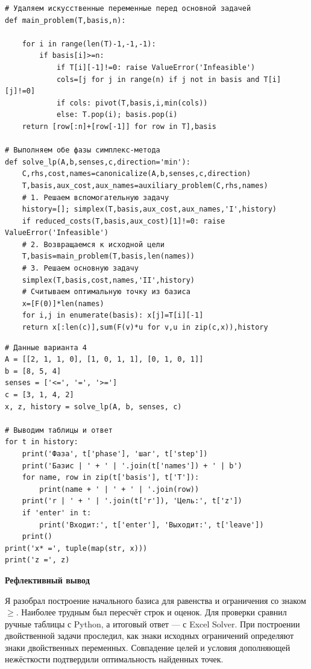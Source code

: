 \documentclass[12pt,a4paper]{article}
\begin{document}
\begin{Verbatim}[fontsize=\scriptsize,breaklines=true,breakanywhere=true]
# Удаляем искусственные переменные перед основной задачей
def main_problem(T,basis,n):

    for i in range(len(T)-1,-1,-1):
        if basis[i]>=n:
            if T[i][-1]!=0: raise ValueError('Infeasible')
            cols=[j for j in range(n) if j not in basis and T[i][j]!=0]
            if cols: pivot(T,basis,i,min(cols))
            else: T.pop(i); basis.pop(i)
    return [row[:n]+[row[-1]] for row in T],basis

# Выполняем обе фазы симплекс-метода
def solve_lp(A,b,senses,c,direction='min'):
    C,rhs,cost,names=canonicalize(A,b,senses,c,direction)
    T,basis,aux_cost,aux_names=auxiliary_problem(C,rhs,names)
    # 1. Решаем вспомогательную задачу
    history=[]; simplex(T,basis,aux_cost,aux_names,'I',history)
    if reduced_costs(T,basis,aux_cost)[1]!=0: raise ValueError('Infeasible')
    # 2. Возвращаемся к исходной цели
    T,basis=main_problem(T,basis,len(names))
    # 3. Решаем основную задачу
    simplex(T,basis,cost,names,'II',history)
    # Считываем оптимальную точку из базиса
    x=[F(0)]*len(names)
    for i,j in enumerate(basis): x[j]=T[i][-1]
    return x[:len(c)],sum(F(v)*u for v,u in zip(c,x)),history
\end{Verbatim}
\begin{Verbatim}[fontsize=\scriptsize,breaklines=true,breakanywhere=true]
# Данные варианта 4
A = [[2, 1, 1, 0], [1, 0, 1, 1], [0, 1, 0, 1]]
b = [8, 5, 4]
senses = ['<=', '=', '>=']
c = [3, 1, 4, 2]
x, z, history = solve_lp(A, b, senses, c)

# Выводим таблицы и ответ
for t in history:
    print('Фаза', t['phase'], 'шаг', t['step'])
    print('Базис | ' + ' | '.join(t['names']) + ' | b')
    for name, row in zip(t['basis'], t['T']):
        print(name + ' | ' + ' | '.join(row))
    print('r | ' + ' | '.join(t['r']), 'Цель:', t['z'])
    if 'enter' in t:
        print('Входит:', t['enter'], 'Выходит:', t['leave'])
    print()
print('x* =', tuple(map(str, x)))
print('z =', z)
\end{Verbatim}
\par\textbf{Рефлективный вывод}\par

Я разобрал построение начального базиса для равенства и ограничения
со знаком $\ge$. Наиболее трудным был пересчёт строк и оценок.
Для проверки сравнил ручные таблицы с Python, а итоговый ответ --- с Excel Solver.
При построении двойственной задачи проследил, как знаки исходных ограничений
определяют знаки двойственных переменных. Совпадение целей и условия
дополняющей нежёсткости подтвердили оптимальность найденных точек.
\end{document}
